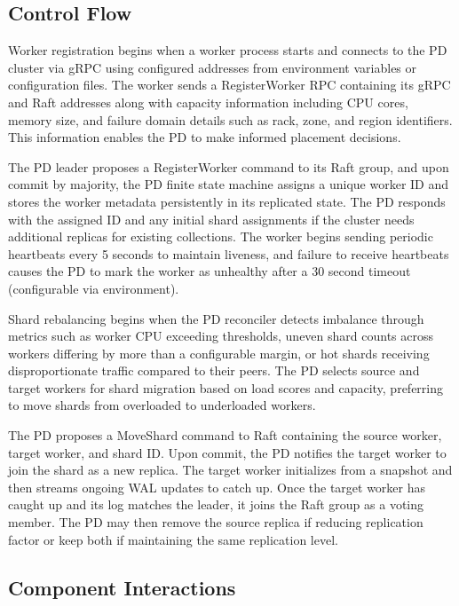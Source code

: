\documentclass[conference]{IEEEtran}
\begin{document}
\subsection{Control Flow}

Worker registration begins when a worker process starts and connects to the PD cluster via gRPC using configured addresses from environment variables or configuration files. The worker sends a RegisterWorker RPC containing its gRPC and Raft addresses along with capacity information including CPU cores, memory size, and failure domain details such as rack, zone, and region identifiers. This information enables the PD to make informed placement decisions.

The PD leader proposes a RegisterWorker command to its Raft group, and upon commit by majority, the PD finite state machine assigns a unique worker ID and stores the worker metadata persistently in its replicated state. The PD responds with the assigned ID and any initial shard assignments if the cluster needs additional replicas for existing collections. The worker begins sending periodic heartbeats every 5 seconds to maintain liveness, and failure to receive heartbeats causes the PD to mark the worker as unhealthy after a 30 second timeout (configurable via environment).

Shard rebalancing begins when the PD reconciler detects imbalance through metrics such as worker CPU exceeding thresholds, uneven shard counts across workers differing by more than a configurable margin, or hot shards receiving disproportionate traffic compared to their peers. The PD selects source and target workers for shard migration based on load scores and capacity, preferring to move shards from overloaded to underloaded workers.

The PD proposes a MoveShard command to Raft containing the source worker, target worker, and shard ID. Upon commit, the PD notifies the target worker to join the shard as a new replica. The target worker initializes from a snapshot and then streams ongoing WAL updates to catch up. Once the target worker has caught up and its log matches the leader, it joins the Raft group as a voting member. The PD may then remove the source replica if reducing replication factor or keep both if maintaining the same replication level.

\subsection{Component Interactions}
\end{document}
